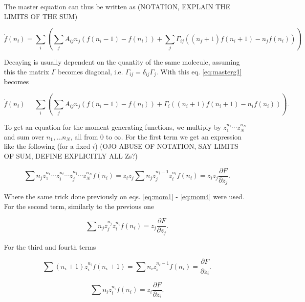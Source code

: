 The master equation can thus be written as (NOTATION, EXPLAIN THE LIMITS OF THE SUM)

\begin{equation}
\label{eq:masterg1}
\dot{f}(n_i) =  \sum_i\left(\sum_j A_{ij}n_j \left( f(n_i-1) - f(n_i) \right) + \sum_j \Gamma_{ij}((n_j+1)f(n_i+1)-n_jf(n_i))\right)
\end{equation}

Decaying is usually dependent on the quantity of the same molecule, assuming this the matrix $\Gamma$ becomes diagonal, i.e. $\Gamma_{ij}=\delta_{ij}\Gamma_j$. With this eq. \ref{eq:masterg1} becomes

\begin{equation}
\label{eq:masterg2}
\dot{f}(n_i) =  \sum_i\left(\sum_j A_{ij}n_j \left( f(n_i-1) - f(n_i) \right) + \Gamma_{i}((n_i+1)f(n_i+1)-n_if(n_i))\right).
\end{equation}

To get an equation for the moment generating functions, we multiply by $z_1^{n_1}\dotsm z_N^{n_N}$ and sum over $n_1,\dotsc n_N$, all from $0$ to $\infty$. For the first term we get an expression like the following (for a fixed $i$) (OJO ABUSE OF NOTATION, SAY LIMITS OF SUM, DEFINE EXPLICITLY ALL Zs?)

\begin{equation}
\label{eq:momg1}
\sum n_j z_1^{n_1}\dotsm z_i^{n_i}\dotsm z_j^{n_j}\dotsm z_N^{n_N} f(n_i) = z_iz_j\sum n_jz_j^{n_j-1}z_i^{n_i}f(n_i) = z_iz_j\frac{\partial F}{\partial z_j}. 
\end{equation} 

Where the same trick done previously on eqs. \ref{eq:mom1} - \ref{eq:mom4} were used. For the second term, similarly to the previous one

\begin{equation}
\label{eq:momg2}
\sum n_jz_j^{n_j}z_i^{n_i}f(n_i) = z_j\frac{\partial F}{\partial z_j}.
\end{equation}

For the third and fourth terms

\begin{equation}
\label{eq:momg3}
\sum (n_i+1)z_i^{n_i}f(n_i+1) = \sum n_i z_i^{n_i-1}f(n_i) = \frac{\partial F}{\partial z_i}.
\end{equation}

\begin{equation}
\label{eq:momg4}
\sum n_iz_i^{n_i}f(n_i) = z_i\frac{\partial F}{\partial z_i}.
\end{equation}

